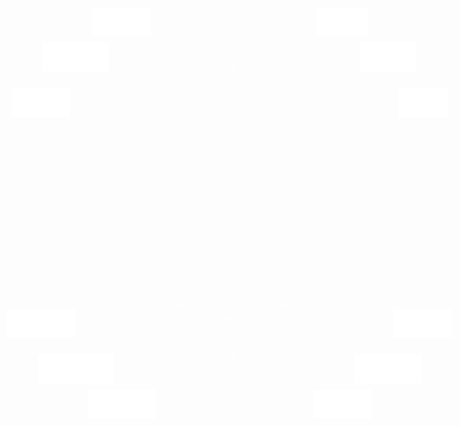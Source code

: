 \documentclass[11pt,letterpaper]{article}
\begin{document}
\[\begin{tikzpicture}[scale=5.3,cap=round,>=latex]
	
	\foreach \x/\xtext/\y in {
		30/\frac{\sqrt{3}}{2}/\frac{1}{2},
		45/\frac{1}{\sqrt{2}}/\frac{1}{\sqrt{2}},
		60/\frac{1}{2}/\frac{\sqrt{3}}{2},
		150/-\frac{\sqrt{3}}{2}/\frac{1}{2},
		135/-\frac{1}{\sqrt{2}}/\frac{1}{\sqrt{2}},
		120/-\frac{1}{2}/\frac{\sqrt{3}}{2},
		210/-\frac{\sqrt{3}}{2}/-\frac{1}{2},
            	225/-\frac{1}{\sqrt{2}}/-\frac{1}{\sqrt{2}},
		240/-\frac{1}{2}/-\frac{\sqrt{3}}{2},
		330/\frac{\sqrt{3}}{2}/-\frac{1}{2},
		315/\frac{1}{\sqrt{2}}/-\frac{1}{\sqrt{2}},
		300/\frac{1}{2}/-\frac{\sqrt{3}}{2}}
		\draw (\x:1.25cm) node[color=white,fill=white] {$\left(\xtext,\y\right)$};
	
	\foreach \x/\xtext in {
    		30/\frac{\pi}{6},
    		45/\frac{\pi}{4},
    		60/\frac{\pi}{3},
    		90/\frac{\pi}{2},
    		120/\frac{2\pi}{3},
    		135/\frac{3\pi}{4},
    		150/\frac{5\pi}{6},
    		180/\pi,
    		210/\frac{7\pi}{6},
    		225/\frac{5\pi}{4},
    		240/\frac{4\pi}{3},
    		270/\frac{3\pi}{2},
    		300/\frac{5\pi}{3},
    		315/\frac{7\pi}{4},
    		330/\frac{11\pi}{6},
    		360/2\pi}
		\draw (\x:0.81cm) node[color=white] {$\xtext$};

	\foreach \x in {0,30,...,330} {
		\draw (\x:0.6cm) node[color=white] {\scriptsize \,$\x^\circ$};
	}
	
	\foreach \x in {0,45,...,315} {
		\draw (\x:0.6cm) node[color=white] {\scriptsize \,$\x^\circ$};
	}	
	\end{tikzpicture}
	\]
\vfill

\end{document}
